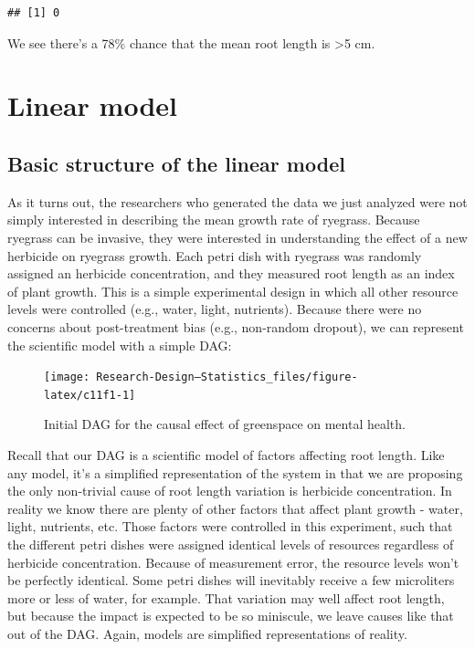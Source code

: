 \documentclass[
]{book}
\begin{document}
\begin{verbatim}
## [1] 0
\end{verbatim}

We see there's a 78\% chance that the mean root length is \textgreater5 cm.

\section{Linear model}\label{linear-model}

\subsection{Basic structure of the linear model}\label{basic-structure-of-the-linear-model}

As it turns out, the researchers who generated the data we just analyzed were not simply interested in describing the mean growth rate of ryegrass. Because ryegrass can be invasive, they were interested in understanding the effect of a new herbicide on ryegrass growth. Each petri dish with ryegrass was randomly assigned an herbicide concentration, and they measured root length as an index of plant growth. This is a simple experimental design in which all other resource levels were controlled (e.g., water, light, nutrients). Because there were no concerns about post-treatment bias (e.g., non-random dropout), we can represent the scientific model with a simple DAG:

\begin{figure}

{\centering \texttt{[image: Research-Design---Statistics\_files/figure-latex/c11f1-1]} 

}

\caption{Initial DAG for the causal effect of greenspace on mental health.}\label{fig:c11f1}
\end{figure}

Recall that our DAG is a scientific model of factors affecting root length. Like any model, it's a simplified representation of the system in that we are proposing the only non-trivial cause of root length variation is herbicide concentration. In reality we know there are plenty of other factors that affect plant growth - water, light, nutrients, etc. Those factors were controlled in this experiment, such that the different petri dishes were assigned identical levels of resources regardless of herbicide concentration. Because of measurement error, the resource levels won't be perfectly identical. Some petri dishes will inevitably receive a few microliters more or less of water, for example. That variation may well affect root length, but because the impact is expected to be so miniscule, we leave causes like that out of the DAG. Again, models are simplified representations of reality.
\end{document}
